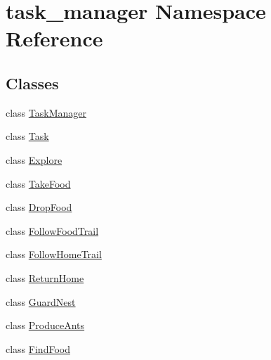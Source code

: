 \hypertarget{namespacetask__manager}{\section{task\+\_\+manager Namespace Reference}
\label{namespacetask__manager}
}
\subsection*{Classes}
\begin{DoxyCompactItemize}
\item 
class \hyperlink{classtask__manager_1_1TaskManager}{Task\+Manager}
\item 
class \hyperlink{classtask__manager_1_1Task}{Task}
\item 
class \hyperlink{classtask__manager_1_1Explore}{Explore}
\item 
class \hyperlink{classtask__manager_1_1TakeFood}{Take\+Food}
\item 
class \hyperlink{classtask__manager_1_1DropFood}{Drop\+Food}
\item 
class \hyperlink{classtask__manager_1_1FollowFoodTrail}{Follow\+Food\+Trail}
\item 
class \hyperlink{classtask__manager_1_1FollowHomeTrail}{Follow\+Home\+Trail}
\item 
class \hyperlink{classtask__manager_1_1ReturnHome}{Return\+Home}
\item 
class \hyperlink{classtask__manager_1_1GuardNest}{Guard\+Nest}
\item 
class \hyperlink{classtask__manager_1_1ProduceAnts}{Produce\+Ants}
\item 
class \hyperlink{classtask__manager_1_1FindFood}{Find\+Food}
\end{DoxyCompactItemize}
